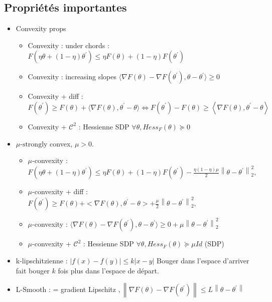 \documentclass{article}
\theoremstyle{plain}%
\theoremstyle{definition}
\theoremstyle{remark}
\begin{document}
\subsection{Propriétés importantes}
\begin{itemize}
    \item Convexity props \begin{itemize}
        \item Convexity : under chords : $ F(\eta \theta + (1 - \eta ) \theta ^\prime ) \leq  \eta F(\theta ) + (1 - \eta ) F(\theta   ^\prime ) $ 
        \item Convexity : increasing slopes $ \langle \nabla F(\theta ) - \nabla F(\theta ^\prime ), \theta - \theta ^\prime \rangle \geq 0 $
        \item Convexity + diff : $ F(\theta ^\prime ) \geq F(\theta ) + \langle  \nabla F(\theta ) , \theta ^\prime - \theta  \rangle \Leftrightarrow F(\theta ^\prime ) - F(\theta ) \geq \left\langle \nabla F(\theta ) , \theta ^\prime - \theta  \right\rangle $ 
        \item Convexity + $ \mathcal{C}^2 $ : Hessienne SDP $ \forall \theta , Hess_F (\theta ) \succeq 0 $
    \end{itemize}
    \item $ \mu \text{-strongly}$ convex, $ \mu > 0 $. \begin{itemize}
        \item $\mu$-convexity : $ F(\eta \theta + (1 - \eta ) \theta ^\prime ) \leq  \eta F(\theta ) + (1 - \eta ) F(\theta ^\prime ) - \frac{\eta (1 - \eta ) \mu }{2} \left\| \theta - \theta ^\prime  \right\| ^2 _2 ,$ 
        \item $\mu$-convexity + diff : $ F(\theta ^\prime ) \geq F(\theta ) + < \nabla F(\theta ) , \theta ^\prime - \theta  > + \frac{\mu }{2} \left\| \theta - \theta ^\prime  \right\|^2_2,  $ 
        \item $\mu$-convexity : $ \langle \nabla F(\theta ) - \nabla F(\theta ^\prime ), \theta - \theta ^\prime \rangle \geq 0 + \mu \left\| \theta - \theta ^\prime  \right\| _2 ^2  $
        \item $\mu$-convexity + $ \mathcal{C}^2 $ : Hessienne SDP $ \forall \theta , Hess_F (\theta ) \succeq \mu Id $ (SDP)
    \end{itemize}
    \item k-lipschitzienne : $ \left| f(x) - f(y) \right| \leq k \left| x - y \right|  $ Bouger dans l'espace d'arriver fait bouger $ k $ fois plus dans l'espace de départ.
    \item L-Smooth : = gradient Lipschitz $, \left\| \nabla F(\theta ) - \nabla F(\theta ^\prime ) \right\| \leq  L \left\| \theta - \theta ^\prime  \right\| $ 

\end{itemize}
\end{document}
